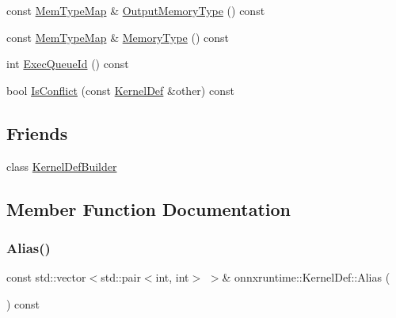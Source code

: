 \begin{DoxyCompactItemize}
\item 
const \mbox{\hyperlink{namespaceonnxruntime_ad53d5ace215052258a4346ee68c2624e}{Mem\+Type\+Map}} \& \mbox{\hyperlink{classonnxruntime_1_1KernelDef_a3c5f3b25f46ca1b522afd2ecace02b93}{Output\+Memory\+Type}} () const
\item 
const \mbox{\hyperlink{namespaceonnxruntime_ad53d5ace215052258a4346ee68c2624e}{Mem\+Type\+Map}} \& \mbox{\hyperlink{classonnxruntime_1_1KernelDef_ab2d22ffd3fb8b3eec5c52ff20adc45d3}{Memory\+Type}} () const
\item 
int \mbox{\hyperlink{classonnxruntime_1_1KernelDef_a2e80ae3bc24e948e7f9913645fbb7f81}{Exec\+Queue\+Id}} () const
\item 
bool \mbox{\hyperlink{classonnxruntime_1_1KernelDef_af4271b4e0263560fcfed7079c95900b2}{Is\+Conflict}} (const \mbox{\hyperlink{classonnxruntime_1_1KernelDef}{Kernel\+Def}} \&other) const
\end{DoxyCompactItemize}
\subsection*{Friends}
\begin{DoxyCompactItemize}
\item 
class \mbox{\hyperlink{classonnxruntime_1_1KernelDef_a33a81fbddaa5f272008974dd2a2bf591}{Kernel\+Def\+Builder}}
\end{DoxyCompactItemize}


\subsection{Member Function Documentation}
\mbox{\label{classonnxruntime_1_1KernelDef_a69d708dea7e1c6f379a5d5b8a3cfba6b}} 
\subsubsection{\texorpdfstring{Alias()}{Alias()}}
{\footnotesize\ttfamily const std\+::vector$<$std\+::pair$<$int, int$>$ $>$\& onnxruntime\+::\+Kernel\+Def\+::\+Alias (\begin{DoxyParamCaption}{ }\end{DoxyParamCaption}) const\hspace{0.3cm}{\ttfamily [inline]}}

\mbox{\label{classonnxruntime_1_1KernelDef_ada26407246c0c73ad1e362b20fc4b12f}} 
